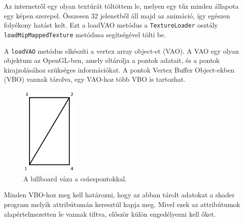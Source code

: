 Az internetről egy olyan textúrát töltöttem le, melyen egy tűz minden állapota egy képen szerepel. Összesen 32 jelenetből áll majd az animáció, így egészen folyékony hatást kelt. Ezt a loadVAO metódus a \texttt{TextureLoader} osztály \texttt{loadMipMappedTexture} metódusa segítségével tölti be. 

A \texttt{loadVAO} metódus elkészíti a vertex array object-et (VAO). A VAO egy olyan objektum az OpenGL-ben, amely eltárolja a pontok adatait, és a pontok kirajzolásához szükséges információkat. A pontok Vertex Buffer Object-ekben (VBO) vannak tárolva, egy VAO-hoz több VBO is tartozhat.

\begin{figure}
 \centering
 \includegraphics[width=0.25\textwidth]{kepek/billboardFrame.png}
 \caption{A billboard váza a csúcspontokkal.}
 \label{fig:spriteFrame}
\end{figure}

Minden VBO-hoz meg kell határozni, hogy az abban tárolt adatokat a shader program melyik attribútumán keresztül kapja meg. Mivel ezek az attribútumok alapértelmezetten le vannak tiltva, először külön engedélyezni kell őket. 

